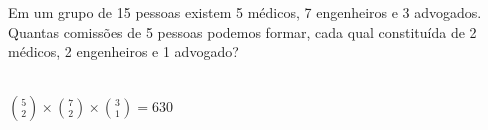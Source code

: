 \begin{ex}
 Em um grupo de 15 pessoas existem 5 médicos, 7 engenheiros e 3 advogados. Quantas comissões de 5 pessoas podemos formar, cada qual constituída de 2 médicos, 2 engenheiros e 1 advogado?
 
 \begin{sol}
     \phantom{A} \\
   $\binom{5}{2} \times \binom{7}{2} \times \binom{3}{1} = 630 $
 
 \end{sol}
\end{ex}